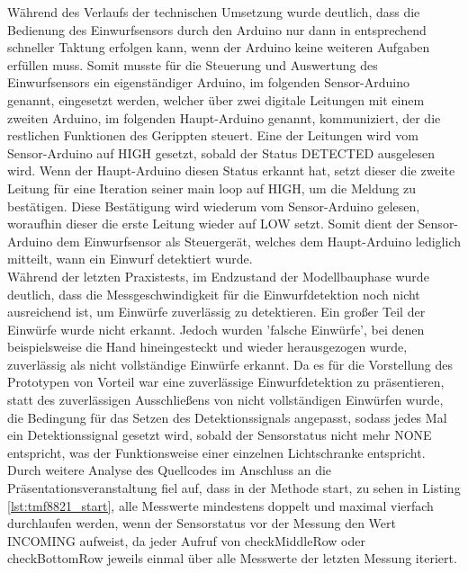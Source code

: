         Während des Verlaufs der technischen Umsetzung wurde deutlich, dass die Bedienung des Einwurfsensors durch den Arduino nur dann in entsprechend schneller Taktung erfolgen kann, wenn der Arduino keine weiteren Aufgaben erfüllen muss. Somit musste für die Steuerung und Auswertung des Einwurfsensors ein eigenständiger Arduino, im folgenden Sensor-Arduino genannt, eingesetzt werden, welcher über zwei digitale Leitungen mit einem zweiten Arduino, im folgenden Haupt-Arduino genannt, kommuniziert, der die restlichen Funktionen des Gerippten steuert. Eine der Leitungen wird vom Sensor-Arduino auf HIGH gesetzt, sobald der Status DETECTED ausgelesen wird. Wenn der Haupt-Arduino diesen Status erkannt hat, setzt dieser die zweite Leitung für eine Iteration seiner main loop auf HIGH, um die Meldung zu bestätigen. Diese Bestätigung wird wiederum vom Sensor-Arduino gelesen, woraufhin dieser die erste Leitung wieder auf LOW setzt. Somit dient der Sensor-Arduino dem Einwurfsensor als Steuergerät, welches dem Haupt-Arduino lediglich mitteilt, wann ein Einwurf detektiert wurde.\\

        Während der letzten Praxistests, im Endzustand der Modellbauphase wurde deutlich, dass die Messgeschwindigkeit für die Einwurfdetektion noch nicht ausreichend ist, um Einwürfe zuverlässig zu detektieren. Ein großer Teil der Einwürfe wurde nicht erkannt. Jedoch wurden 'falsche Einwürfe', bei denen beispielsweise die Hand hineingesteckt und wieder herausgezogen wurde, zuverlässig als nicht vollständige Einwürfe erkannt. Da es für die Vorstellung des Prototypen von Vorteil war eine zuverlässige Einwurfdetektion zu präsentieren, statt des zuverlässigen Ausschließens von nicht vollständigen Einwürfen wurde, die Bedingung für das Setzen des Detektionssignals angepasst, sodass jedes Mal ein Detektionssignal gesetzt wird, sobald der Sensorstatus nicht mehr NONE entspricht, was der Funktionsweise einer einzelnen Lichtschranke entspricht. Durch weitere Analyse des Quellcodes im Anschluss an die Präsentationsveranstaltung fiel auf, dass in der Methode start, zu sehen in Listing \ref{lst:tmf8821_start}, alle Messwerte mindestens doppelt und maximal vierfach durchlaufen werden, wenn der Sensorstatus vor der Messung den Wert INCOMING aufweist, da jeder Aufruf von checkMiddleRow oder checkBottomRow jeweils einmal über alle Messwerte der letzten Messung iteriert.\\
        
